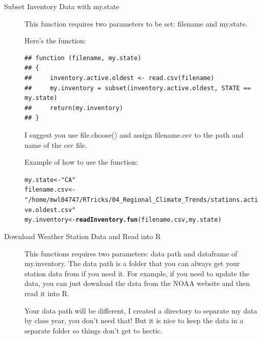 \documentclass{article}\usepackage[]{graphicx}\usepackage[]{xcolor}
\makeatletter
\newcommand{\hlstr}[1]{\textcolor[rgb]{0.192,0.494,0.8}{#1}}%
\newcommand{\hlstd}[1]{\textcolor[rgb]{0.345,0.345,0.345}{#1}}%
\newcommand{\hlkwb}[1]{\textcolor[rgb]{0.69,0.353,0.396}{#1}}%
\newcommand{\hlkwd}[1]{\textcolor[rgb]{0.737,0.353,0.396}{\textbf{#1}}}%
\newenvironment{kframe}{%
 \def\at@end@of@kframe{}%
 \ifinner\ifhmode%
  \def\at@end@of@kframe{\end{minipage}}%
  \begin{minipage}{\columnwidth}%
 \fi\fi%
 \def\FrameCommand##1{\hskip\@totalleftmargin \hskip-\fboxsep
 \colorbox{shadecolor}{##1}\hskip-\fboxsep
     \hskip-\linewidth \hskip-\@totalleftmargin \hskip\columnwidth}%
 \MakeFramed {\advance\hsize-\width
   \@totalleftmargin\z@ \linewidth\hsize
   \@setminipage}}%
 {\par\unskip\endMakeFramed%
 \at@end@of@kframe}
\newenvironment{knitrout}{}{} %
\makeatother
\begin{document}
\begin{description}

\item[Subset Inventory Data with my.state]  

This function requires two parameters to be set: filename and my.state. 

Here's the function:

\begin{knitrout}
\color{fgcolor}\begin{kframe}
\begin{verbatim}
## function (filename, my.state) 
## {
##     inventory.active.oldest <- read.csv(filename)
##     my.inventory = subset(inventory.active.oldest, STATE == my.state)
##     return(my.inventory)
## }
\end{verbatim}
\end{kframe}
\end{knitrout}

I suggest you use file.choose() and assign filename.csv to the path and name of the csv file. 

Example of how to use the function:

\begin{knitrout}
\color{fgcolor}\begin{kframe}
\begin{alltt}
\hlstd{my.state} \hlkwb{<-} \hlstr{"CA"}
\hlstd{filename.csv} \hlkwb{<-} \hlstr{"/home/mwl04747/RTricks/04_Regional_Climate_Trends/stations.active.oldest.csv"}
\hlstd{my.inventory} \hlkwb{<-} \hlkwd{readInventory.fun}\hlstd{(filename.csv, my.state)}
\end{alltt}
\end{kframe}
\end{knitrout}


\item[Download Weather Station Data and Read into R]

This functions requires two parameters: data path and dataframe of my.inventory. The data path is a folder that you can always get your station data from if you need it. For example, if you need to update the data, you can just download the data from the NOAA website and then read it into R. 

Your data path will be different, I created a directory to separate my data by class year, you don't need that! But it is nice to keep the data in a separate folder so things don't get to hectic.


\end{description}
\end{document}
